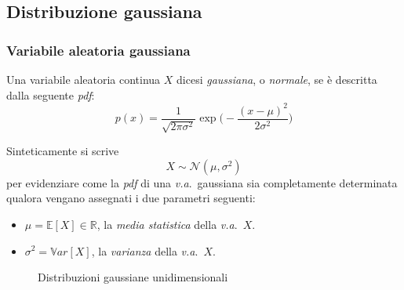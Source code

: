 \subsection{Distribuzione gaussiana}

\subsubsection{Variabile aleatoria gaussiana}

\begin{Mybox}
    \begin{definizione}
     Una variabile aleatoria continua $X$ dicesi \emph{gaussiana}, o \emph{normale}, se è descritta dalla seguente \emph{pdf}:
    \begin{equation}
        p(x)=\frac{1}{\sqrt{2 \pi \sigma^2}} \exp \Biggl(-\frac{(x-\mu)^2}{2 \sigma^2}\Biggr)
    \end{equation}    
    \end{definizione}
\end{Mybox}


\noindent Sinteticamente si scrive 
\[
    X \sim \mathcal{N}(\mu, \sigma^2) 
\]
per evidenziare come la \emph{pdf} di una \emph{v.a}.\ gaussiana sia completamente determinata qualora vengano assegnati i due parametri seguenti: 
\begin{itemize}
    \item $\mu=\mathbb{E}[X]\in \mathbb{R}$, la \emph{media statistica} della \emph{v.a}.\ $X$.
    \item $\sigma^2=\mathbb{V}ar[X]$, la \emph{varianza} della \emph{v.a}.\ $X$.
\end{itemize} 

\begin{figure}
    \centering
     \quad
  \caption{Distribuzioni gaussiane unidimensionali}
\label{fig:normali1D}
\end{figure}

\smallskip 

